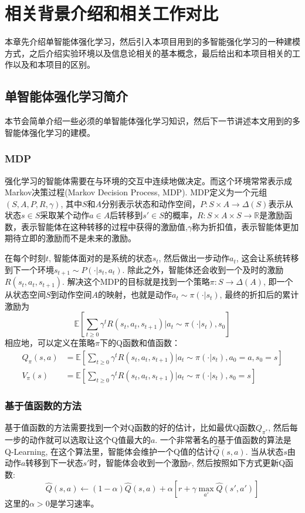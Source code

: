 
\chapter{相关背景介绍和相关工作对比}
本章先介绍单智能体强化学习，然后引入本项目用到的多智能强化学习的一种建模方式，之后介绍实验环境以及信息论相关的基本概念，最后给出和本项目相关的工作以及和本项目的区别。
\section{单智能体强化学习简介}
本节会简单介绍一些必须的单智能体强化学习知识，然后下一节讲述本文用到的多智能体强化学习的建模。

\subsection{MDP}
强化学习的智能体需要在与环境的交互中连续地做决定。而这个环境常常表示成Markov决策过程(Markov Decision Process, MDP). MDP定义为一个元组$(S,A,P,R,\gamma)$, 其中$S$和$A$分别表示状态和动作空间，$P:S\times A\to \Delta (S)$表示从状态$s\in S$采取某个动作$a\in A$后转移到$s'\in S$的概率，$R: S\times A\times S\to \mathbb{R}$是激励函数，表示智能体在这种转移的过程中获得的激励值,$\gamma$称为折扣值，表示智能体更加期待立即的激励而不是未来的激励。

在每个时刻$t$, 智能体面对的是系统的状态$s_t$, 然后做出一步动作$a_t$, 这会让系统转移到下一个环境$s_{t+1}\sim P(\cdot|s_t,a_t)$. 除此之外，智能体还会收到一个及时的激励$R(s_t,a_t,s_{t+1})$. 解决这个MDP的目标就是找到一个策略$\pi:S\to \Delta(A)$, 即一个从状态空间$S$到动作空间$A$的映射，也就是动作$a_t\sim \pi(\cdot|s_t)$, 最终的折扣后的累计激励为
\begin{equation}
    \mathbb{E}\left[\sum_{t\ge 0}\gamma^t R(s_t,a_t,s_{t+1})\bigg|a_t\sim\pi(\cdot|s_t),s_0    \right]
\end{equation}
相应地，可以定义在策略$\pi$下的Q函数和值函数：
\begin{align}
Q_\pi(s,a) &= \mathbb{E}\left[\sum_{t\ge 0}\gamma^t R(s_t,a_t,s_{t+1})\bigg|a_t\sim\pi(\cdot|s_t),a_0=a,s_0 =s\right] \\
V_\pi(s) &= \mathbb{E}\left[\sum_{t\ge 0}\gamma^t R(s_t,a_t,s_{t+1})\bigg|a_t\sim\pi(\cdot|s_t),s_0 =s\right]
\end{align}

\subsection{基于值函数的方法}
基于值函数的方法需要找到一个对Q函数的好的估计，比如最优Q函数$Q_{\pi^*}$, 然后每一步的动作就可以选取让这个Q值最大的$a$. 一个非常著名的基于值函数的算法是Q-Learning, 在这个算法里，智能体会维护一个Q值的估计$\hat{Q}(s,a)$. 当从状态$s$由动作$a$转移到下一状态$s'$时，智能体会收到一个激励$r$, 然后按照如下方式更新Q函数:
\begin{equation}
    \hat{Q}(s,a)\leftarrow (1-\alpha)\hat{Q}(s,a) + \alpha \left[ r + \gamma \max_{a'}\hat{Q}(s',a') \right]
\end{equation}
这里的$\alpha>0$是学习速率。

